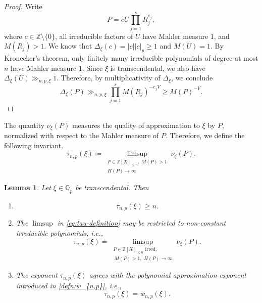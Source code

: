 \documentclass[12pt,reqno]{amsart}
\newtheorem{lemma}[theorem]{Lemma}
\theoremstyle{definition}
\theoremstyle{remark}
\newcommand{\Z}{\mathbb Z}
\newcommand{\Qp}{\mathbb Q_p}
\begin{document}
\begin{proof}
Write
$$
P=cU\prod_{j=1}^sR_j^{e_j},
$$
where $c\in\Z\setminus\{0\}$, all irreducible factors of $U$ have Mahler
measure $1$, and $M(R_j)>1$. We know that $\Delta_\xi(c)=|c||c|_p\geq1$ and $M(U)=1$. By Kronecker's theorem, only finitely many irreducible polynomials of degree at most $n$ have Mahler measure $1$. Since $\xi$ is transcendental, we also have $\Delta_\xi(U)\gg_{n,p,\xi}1$. Therefore, by multiplicativity of $\Delta_\xi$, we conclude
$$
\Delta_\xi(P)
\gg_{n,p,\xi}\prod_{j=1}^sM(R_j)^{-e_jV}
\geq M(P)^{-V}.
$$
\end{proof}

The quantity $\nu_\xi(P)$ measures the quality of approximation to $\xi$ by $P$, normalized with respect to the Mahler measure of $P$. Therefore, we define the following invariant.
\begin{equation}\label{eq:tau-definition}
\tau_{n,p}(\xi)
\coloneqq
\limsup_{\substack{P\in\Z[X]_{\leq n},\ M(P)>1\\H(P)\to\infty}}
\nu_\xi(P).
\end{equation}
\begin{lemma}\label{lem:dirichlet-quality}
Let $\xi\in\Qp$ be transcendental. Then
\begin{enumerate}[label=\textup{(\roman*)}]
    \item $$
            \tau_{n,p}(\xi)\geq n.
        $$
        \item The $\limsup$ in \eqref{eq:tau-definition} may be restricted to non-constant irreducible polynomials, i.e.,
        \begin{equation}\label{eq:irreducible-extraction}
            \tau_{n,p}(\xi)
                =
                \limsup_{\substack{P\in\Z[X]_{\leq n} \text{ irred},\\\ M(P)>1,\,\,H(P)\to\infty}}
                \nu_\xi(P).
        \end{equation}
        \item The exponent $\tau_{n,p}(\xi)$ agrees with the polynomial approximation
exponent introduced in \eqref{defn:w_{n,p}}, i.e.,
\begin{equation}\label{eq:tau-w}
\tau_{n,p}(\xi)=w_{n,p}(\xi).
\end{equation}
\end{enumerate}

\end{lemma}
\end{document}

